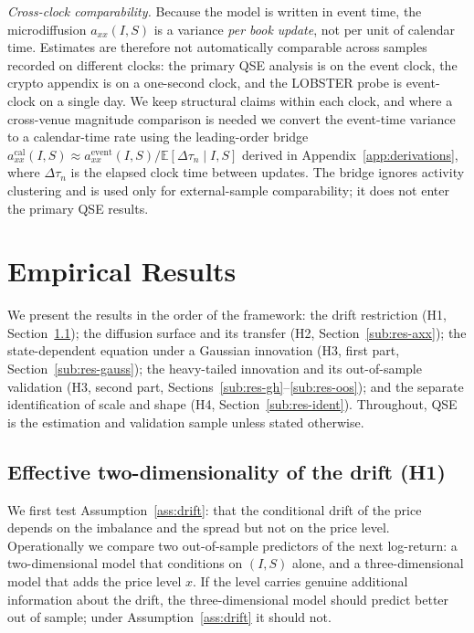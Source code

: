 \documentclass[11pt]{article}
\theoremstyle{plain}
\theoremstyle{definition}
\newcommand{\E}{\mathbb{E}}
\newcommand{\axx}{a_{xx}}
\begin{document}
\emph{Cross-clock comparability.} Because the model is written in event time, the
microdiffusion $\axx(I,S)$ is a variance \emph{per book update}, not per unit of calendar
time. Estimates are therefore not automatically comparable across samples recorded on
different clocks: the primary QSE analysis is on the event clock, the crypto appendix is
on a one-second clock, and the LOBSTER probe is event-clock on a single day. We keep
structural claims within each clock, and where a cross-venue magnitude comparison is
needed we convert the event-time variance to a calendar-time rate using the leading-order
bridge $a^{\mathrm{cal}}_{xx}(I,S)\approx a^{\mathrm{event}}_{xx}(I,S)/\E[\Delta\tau_n\mid
I,S]$ derived in Appendix~\ref{app:derivations}, where $\Delta\tau_n$ is the elapsed clock
time between updates. The bridge ignores activity clustering and is used only for
external-sample comparability; it does not enter the primary QSE results.

\section{Empirical Results}
\label{sec:results}

We present the results in the order of the framework: the drift restriction (H1,
Section~\ref{sub:res-drift}); the diffusion surface and its transfer (H2,
Section~\ref{sub:res-axx}); the state-dependent equation under a Gaussian
innovation (H3, first part, Section~\ref{sub:res-gauss}); the heavy-tailed
innovation and its out-of-sample validation (H3, second part,
Sections~\ref{sub:res-gh}--\ref{sub:res-oos}); and the separate identification of
scale and shape (H4, Section~\ref{sub:res-ident}). Throughout, QSE is the estimation
and validation sample unless stated otherwise.

\subsection{Effective two-dimensionality of the drift (H1)}
\label{sub:res-drift}

We first test Assumption~\ref{ass:drift}: that the conditional drift of the price
depends on the imbalance and the spread but not on the price level. Operationally we
compare two out-of-sample predictors of the next log-return: a two-dimensional model
that conditions on $(I,S)$ alone, and a three-dimensional model that adds the price
level $x$. If the level carries genuine additional information about the drift, the
three-dimensional model should predict better out of sample; under
Assumption~\ref{ass:drift} it should not.
\end{document}
